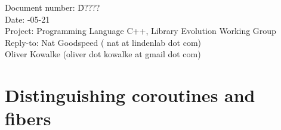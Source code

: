 \documentclass[a4paper,10pt,DIV15]{scrartcl}
\begin{document}
\small
\begin{tabbing}
    Document number: \=  D????\\
    Date:            -05-21 \\
    Project:         \> Programming Language C++, Library Evolution Working Group\\
    Reply-to:        \> Nat Goodspeed ( nat at lindenlab dot com)\\
                     \> Oliver Kowalke (oliver dot kowalke at gmail dot com)\\
\end{tabbing}

\section*{Distinguishing coroutines and fibers}


\tableofcontents












\end{document}
